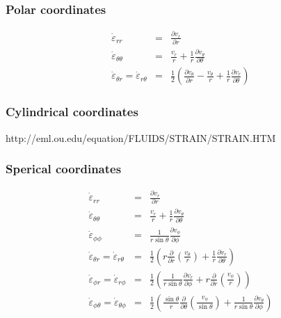 \subsubsection{Polar coordinates}

\begin{eqnarray}
\dot\varepsilon_{rr} &=& \frac{\partial v_r}{\partial r} \\
\dot\varepsilon_{\theta\theta} &=& \frac{v_r}{r} + \frac{1}{r} \frac{\partial v_\theta}{\partial \theta}  \\
\dot\varepsilon_{\theta r} =
\dot\varepsilon_{r\theta} &=& \frac{1}{2} \left(   \frac{\partial v_\theta}{\partial r} - \frac{v_\theta}{r} 
+\frac{1}{r} \frac{\partial v_r}{\partial \theta}  \right) 
\end{eqnarray}

\subsubsection{Cylindrical coordinates}

http://eml.ou.edu/equation/FLUIDS/STRAIN/STRAIN.HTM

\subsubsection{Sperical coordinates}

\begin{eqnarray}
\dot\varepsilon_{rr} &=& \frac{\partial v_r}{\partial r} \\
\dot\varepsilon_{\theta\theta} &=& \frac{v_r}{r} + \frac{1}{r} \frac{\partial v_\theta}{\partial \theta}  \\
\dot\varepsilon_{\phi\phi} &=& \frac{1}{r \sin\theta} \frac{\partial v_\phi}{\partial \phi} \\
\dot\varepsilon_{\theta r} =
\dot\varepsilon_{r\theta}   &=& \frac{1}{2} \left( r \frac{\partial}{\partial r} (\frac{v_\theta}{r} ) 
+\frac{1}{r} \frac{\partial v_r}{\partial \theta} \right) \\
\dot\varepsilon_{\phi r} =
\dot\varepsilon_{r\phi}      &=&  \frac{1}{2} \left(  \frac{1}{r \sin\theta} \frac{\partial v_r}{\partial \phi} 
+ r \frac{\partial }{\partial r} (\frac{v_\phi}{r}) \right)  \\
\dot\varepsilon_{\phi \theta} =
\dot\varepsilon_{\theta\phi} &=& \frac{1}{2} \left( \frac{\sin \theta}{r} \frac{\partial }{\partial \theta} (\frac{v_\phi}{\sin\theta}) + \frac{1}{r \sin\theta} \frac{\partial v_\theta}{\partial \phi}    \right) 
\end{eqnarray}



